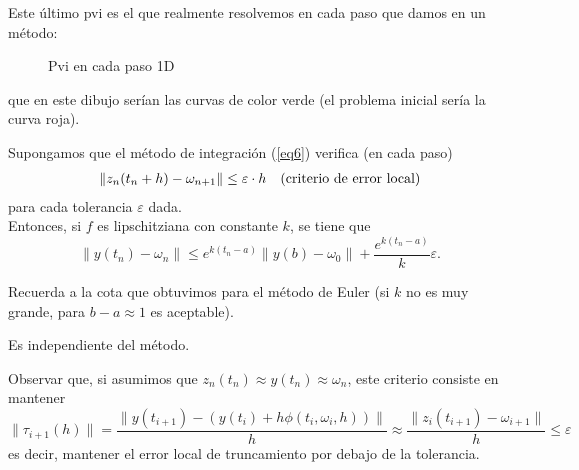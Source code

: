 Este último pvi es el que realmente resolvemos en cada paso que damos en un método:
\begin{figure}[H]
    \centering
    \caption{Pvi en cada paso 1D}
\end{figure}
que en este dibujo serían las curvas de color verde (el problema inicial sería la curva roja).
\begin{theorem}
Supongamos que el método de integración  (\ref{eq6}) verifica (en cada paso)
$$
\begin{array}{ll}
\|z_n(t_n+h) - \omega_{n+1}\| \leq \varepsilon\cdot h & \textnormal{(criterio de error local)}
\end{array}
$$
para cada tolerancia $\varepsilon$ dada.\\
Entonces, si $f$ es lipschitziana con constante $k$, se tiene que 
$$
\|y(t_n)-\omega_n\| \leq e^{k(t_n-a)}\|y(b)-\omega_0\| + \frac{e^{k(t_n-a)}}{k}\varepsilon.
$$
\end{theorem}
\begin{remark}
Recuerda a la cota que obtuvimos para el método de Euler (si $k$ no es muy grande, para $b-a\approx 1$ es aceptable).
\end{remark}
\begin{remark}
Es independiente del método.
\end{remark}
\begin{remark}
Observar que, si asumimos que $z_n(t_n) \approx y(t_n) \approx \omega_n $, este criterio consiste en mantener
$$
\|\tau_{i+1}(h)\| = \frac{\| y(t_{i+1}) - (y(t_i) + h\phi(t_i, \omega_i, h)) \|}{h} \approx \frac{\| z_i(t_{i+1}) - \omega_{i+1} \|}{h} \leq \varepsilon
$$
es decir, mantener el error local de truncamiento por debajo de la tolerancia.
\end{remark}


